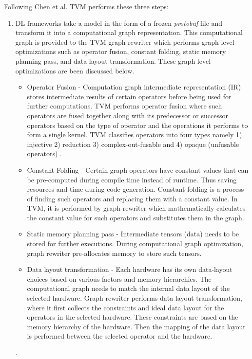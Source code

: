Following Chen et al.\cite{tvm_fig} TVM performs these three steps: 
\begin{enumerate}
  \item DL frameworks take a model in the form of a frozen \textit{protobuf} file and transform it into a computational graph representation. This computational graph is provided to the TVM graph rewriter which performs graph level optimizations such as operator fusion, constant folding, static memory planning pass, and data layout transformation. These graph level optimizations are been discussed below.
  \begin{itemize}
     \item Operator Fusion - Computation graph intermediate representation (IR) stores intermediate results of certain operators before being used for further computations. TVM performs operator fusion where such operators are fused together along with its predecessor or successor operators based on the type of operator and the operations it performs to form a single kernel. TVM classifies operators into four types namely 1) injective 2) reduction 3) complex-out-fusable and 4) opaque (unfusable operators) \cite{tvm_fig}.
     \item Constant Folding - Certain graph operators have constant values that can be pre-computed during compile time instead of runtime. Thus saving resources and time during code-generation. Constant-folding is a process of finding such operators and replacing them with a constant value. In TVM, it is performed by graph rewriter which mathematically calculates the constant value for such operators and substitutes them in the graph.
     \item Static memory planning pass - Intermediate tensors (data) needs to be stored for further executions. During computational graph optimization, graph rewriter pre-allocates memory to store such tensors.
     \item Data layout transformation - Each hardware has its own data-layout choices based on various factors and memory hierarchies. The computational graph needs to match the internal data layout of the selected hardware. Graph rewriter performs data layout transformation, where it first collects the constraints and ideal data layout for the operators in the selected hardware. These constraints are based on the memory hierarchy of the hardware. Then the mapping of the data layout is performed between the selected operator and the hardware.
   \end{itemize}.
   

\end{enumerate}
